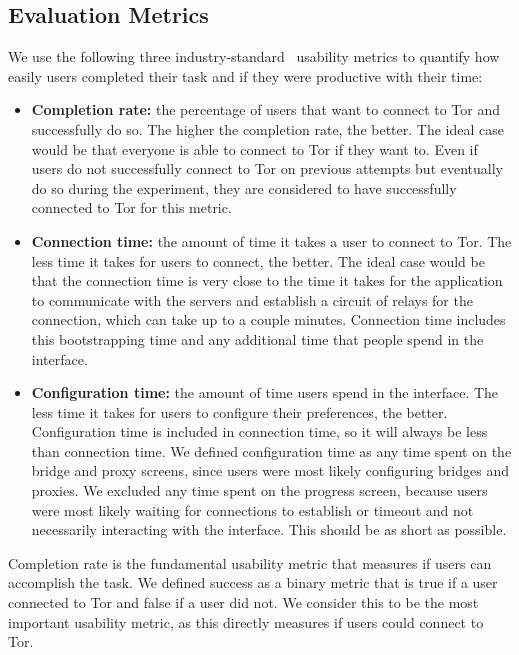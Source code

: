 \documentclass[USenglish,oneside,twocolumn]{article}
\begin{document}
\subsection{Evaluation Metrics}
\label{sec:eval}
We use the following three industry-standard~\cite{albert2013measuring} usability metrics to quantify how easily users completed their task and if they were productive with their time: \\

\begin{itemize}
\item {\bfseries Completion rate:}  the percentage of users that want to connect to Tor and successfully do so. The higher the completion rate, the better. The ideal case would be that everyone is able to connect to Tor if they want to. Even if users do not successfully connect to Tor on previous attempts but eventually do so during the experiment, they are considered to have successfully connected to Tor for this metric.
\item {\bfseries Connection time:} the amount of  time it takes a user to connect to Tor. The less time it takes for users to connect, the better. The ideal case would be that the connection time is very close to the time it takes for the application to communicate with the servers and establish a circuit of relays for the connection, which can take up to a couple minutes. Connection time includes this bootstrapping time and any additional time that people spend in the interface. 
\item {\bfseries Configuration time:} the amount of time users spend in the interface. The less time it takes for users to configure their preferences, the better. Configuration time is included in connection time, so it will always be less than connection time. We defined configuration time as any time spent on the bridge and proxy screens, since users were most likely configuring bridges and proxies. We excluded any time spent on the progress screen, because users were most likely waiting for connections to establish or timeout and not necessarily interacting with the interface. This should be as short as possible.
\end{itemize}

Completion rate is the fundamental usability metric that measures if users can accomplish the task. We defined success as a binary metric that is true if a user connected to Tor and false if a user did not. We consider this to be the most important usability metric, as this directly measures if users could connect to Tor. 
\end{document}
